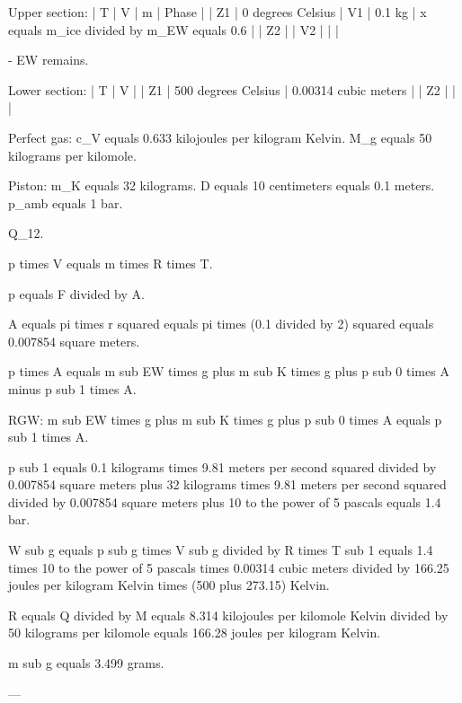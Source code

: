 Upper section:  
| T | V | m | Phase |  
| Z1 | 0 degrees Celsius | V1 | 0.1 kg | x equals m_ice divided by m_EW equals 0.6 |  
| Z2 | | V2 | | |  

- EW remains.  

Lower section:  
| T | V |  
| Z1 | 500 degrees Celsius | 0.00314 cubic meters |  
| Z2 | | |  

Perfect gas:  
c_V equals 0.633 kilojoules per kilogram Kelvin.  
M_g equals 50 kilograms per kilomole.  

Piston:  
m_K equals 32 kilograms.  
D equals 10 centimeters equals 0.1 meters.  
p_amb equals 1 bar.  

Q_12.

p times V equals m times R times T.  

p equals F divided by A.  

A equals pi times r squared equals pi times (0.1 divided by 2) squared equals 0.007854 square meters.  

p times A equals m sub EW times g plus m sub K times g plus p sub 0 times A minus p sub 1 times A.  

RGW:  
m sub EW times g plus m sub K times g plus p sub 0 times A equals p sub 1 times A.  

p sub 1 equals 0.1 kilograms times 9.81 meters per second squared divided by 0.007854 square meters plus 32 kilograms times 9.81 meters per second squared divided by 0.007854 square meters plus 10 to the power of 5 pascals equals 1.4 bar.  

W sub g equals p sub g times V sub g divided by R times T sub 1 equals 1.4 times 10 to the power of 5 pascals times 0.00314 cubic meters divided by 166.25 joules per kilogram Kelvin times (500 plus 273.15) Kelvin.  

R equals Q divided by M equals 8.314 kilojoules per kilomole Kelvin divided by 50 kilograms per kilomole equals 166.28 joules per kilogram Kelvin.  

m sub g equals 3.499 grams.  

---
